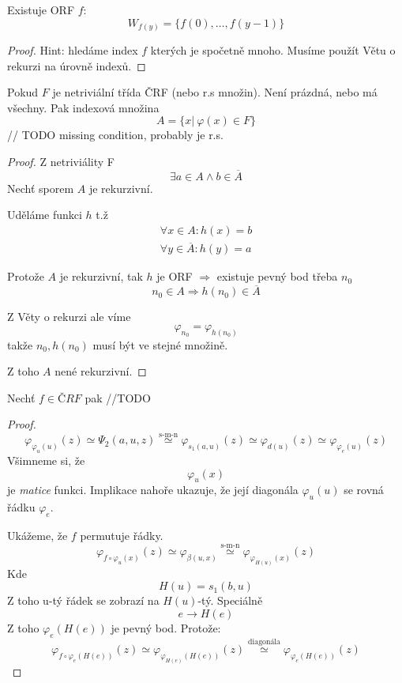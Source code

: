 \begin{theorem}[BD]
	Existuje ORF $f$:
	\[ W_{f(y)} = \{ f(0), \ldots, f(y - 1) \} \]
\end{theorem}
\begin{proof}
	Hint: hledáme index $f$ kterých je spočetně mnoho.
	Musíme použít Větu o rekurzi na úrovně indexů.
\end{proof}

\begin{theorem}
	Pokud $F$ je netriviální třída ČRF (nebo r.s množin).
	Není prázdná, nebo má všechny.
	Pak indexová množina
	\[ A = \{ x |\ \varphi(x) \in F \} \]
	// TODO missing condition, probably je r.s.
\end{theorem}
\begin{proof}
	Z netriviálity F
	\[ \exists a \in A \land b \in \overline{A} \]
	Nechť sporem $A$ je rekurzivní.

	Uděláme funkci $h$ t.ž
	\begin{gather*}
		\forall x \in A: h(x) = b \\
		\forall y \in \overline{A}: h(y) = a
	\end{gather*}

	Protože $A$ je rekurzivní, tak $h$ je ORF $\Rightarrow$ existuje pevný bod třeba $n_0$
	\[ n_0 \in A \Rightarrow h(n_0) \in \overline{A} \]

	Z Věty o rekurzi ale víme
	\[ \varphi_{n_0} = \varphi_{h(n_0)} \]
	takže $n_0, h(n_0)$ musí být ve stejné množině.

	Z toho $A$ nené rekurzivní.
\end{proof}

\begin{theorem}[O rekurzi (BD)]
	Nechť $f \in ČRF$ pak
	//TODO
\end{theorem}
\begin{proof}
	\[ \varphi_{\varphi_u(u)} (z) \simeq \Psi_2(a, u, z) \stackrel{\text{s-m-n}}{\simeq} \varphi_{s_1(a, u)} (z) \simeq \varphi_{d(u)} (z) \simeq \varphi_{\varphi_e(u)} (z) \]
	Všimneme si, že
	\[ \varphi_u(x) \]
	je \emph{matice} funkci. Implikace nahoře ukazuje, že její diagonála $\varphi_u(u)$ se rovná řádku $\varphi_e$.

	Ukážeme, že $f$ permutuje řádky.
	\[ \varphi_{f \circ \varphi_u (x)} (z) \simeq \varphi_{\beta(u, x)} \stackrel{\text{s-m-n}}{\simeq} \varphi_{\varphi_{H(u)}(x)} (z) \]
	Kde
	\[ H(u) = s_1(b, u) \]
	Z toho u-tý řádek se zobrazí na $H(u)$-tý.
	Speciálně
	\[ e \to H(e) \]
	Z toho $\varphi_e(H(e))$ je pevný bod. Protože:
	\[ \varphi_{f \circ \varphi_e(H(e))} (z) \simeq \varphi_{\varphi_{H(e)}(H(e))} (z) \stackrel{\text{diagonála}}{\simeq} \varphi_{\varphi_e(H(e))} (z) \]
\end{proof}
